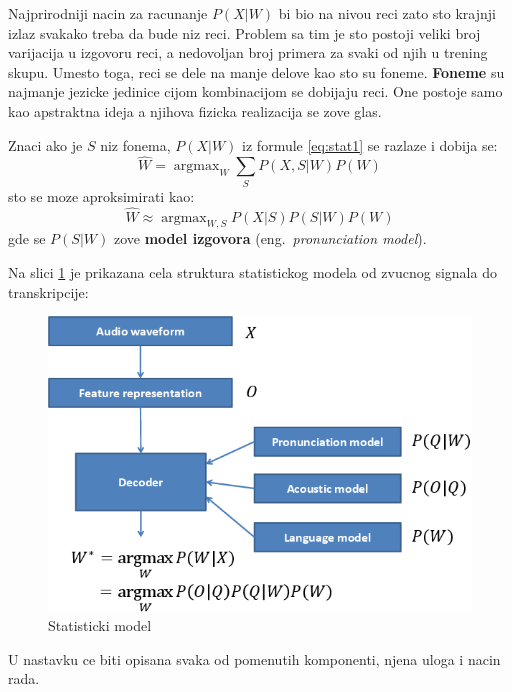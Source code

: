 \documentclass[a4paper]{article}
\DeclareMathOperator*{\argmax}{argmax}
\begin{document}
Najprirodniji nacin za racunanje $P(X|W)$ bi bio na nivou reci zato sto krajnji izlaz svakako treba da bude niz reci.
Problem sa tim je sto postoji veliki broj varijacija u izgovoru reci, a nedovoljan broj primera za svaki od njih u trening skupu.
Umesto toga, reci se dele na manje delove kao sto su foneme.
\textbf{Foneme} su najmanje jezicke jedinice cijom kombinacijom se dobijaju reci. One postoje samo kao apstraktna ideja a njihova fizicka realizacija se zove glas.

Znaci ako je $S$ niz fonema, $P(X|W)$ iz formule \ref{eq:stat1} se razlaze i dobija se:
\begin{equation*}
  \hat{W} = \argmax_{W} \sum_{S} P(X,S|W) P(W)
\end{equation*}
sto se moze aproksimirati kao:
\begin{equation}
  \label{eq:stat2}
  \hat{W} \approx \argmax_{W,S} P(X|S) P(S|W) P(W)
\end{equation}
gde se $P(S|W)$ zove \textbf{model izgovora} (eng.~{\em pronunciation model}). 

Na slici \ref{fig:statistical_model} je prikazana cela struktura statistickog modela od zvucnog signala do transkripcije:
\begin{figure}[h!]
  \begin{center}
    \includegraphics[scale=0.4]{statistical_model.png}
  \end{center}
  \caption{Statisticki model}
  \label{fig:statistical_model}
\end{figure}

U nastavku ce biti opisana svaka od pomenutih komponenti, njena uloga i nacin rada.
\end{document}

